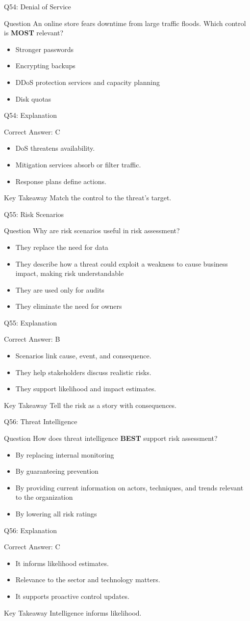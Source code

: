 \documentclass[aspectratio=169]{beamer}
\newcommand{\hq}[7]{%
	\begin{frame}{Q#1: #2}
		\begin{block}{Question}
			#3
		\end{block}
		\begin{itemize}
			#4
		\end{itemize}
	\end{frame}
	\begin{frame}{Q#1: Explanation}
		\begin{block}{Correct Answer: #5}
			\begin{itemize}
				#6
			\end{itemize}
		\end{block}
		\begin{alertblock}{Key Takeaway}
			#7
		\end{alertblock}
	\end{frame}
}
\begin{document}
	\hq{54}{Denial of Service}
	{An online store fears downtime from large traffic floods. Which control is \textbf{MOST} relevant?}
	{\item[\textbf{(A)}] Stronger passwords
		\item[\textbf{(B)}] Encrypting backups
		\item[\textbf{(C)}] DDoS protection services and capacity planning
		\item[\textbf{(D)}] Disk quotas}
	{C}
	{\item DoS threatens availability.
		\item Mitigation services absorb or filter traffic.
		\item Response plans define actions.}
	{Match the control to the threat's target.}
	
	\hq{55}{Risk Scenarios}
	{Why are risk scenarios useful in risk assessment?}
	{\item[\textbf{(A)}] They replace the need for data
		\item[\textbf{(B)}] They describe how a threat could exploit a weakness to cause business impact, making risk understandable
		\item[\textbf{(C)}] They are used only for audits
		\item[\textbf{(D)}] They eliminate the need for owners}
	{B}
	{\item Scenarios link cause, event, and consequence.
		\item They help stakeholders discuss realistic risks.
		\item They support likelihood and impact estimates.}
	{Tell the risk as a story with consequences.}
	
	\hq{56}{Threat Intelligence}
	{How does threat intelligence \textbf{BEST} support risk assessment?}
	{\item[\textbf{(A)}] By replacing internal monitoring
		\item[\textbf{(B)}] By guaranteeing prevention
		\item[\textbf{(C)}] By providing current information on actors, techniques, and trends relevant to the organization
		\item[\textbf{(D)}] By lowering all risk ratings}
	{C}
	{\item It informs likelihood estimates.
		\item Relevance to the sector and technology matters.
		\item It supports proactive control updates.}
	{Intelligence informs likelihood.}
	
\end{document}
